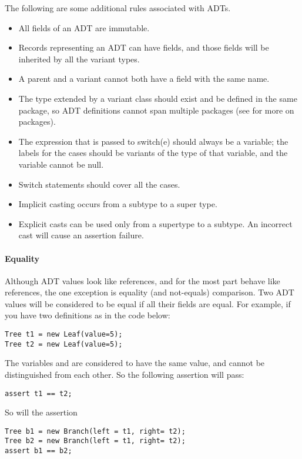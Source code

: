 The following are some additional rules associated with ADTs.
\begin{itemize}
\item All fields of an ADT are immutable.
\item Records representing an ADT can have fields, and those fields will be inherited by all the variant types.
\item A parent and a variant cannot both have a field with the same name.
\item The type extended by a variant class should exist and be defined in the same package, so ADT definitions cannot span multiple packages (see  for more on packages).
\item The expression that is passed to switch(e) should always be a variable; the labels for the cases should be variants of the type of that variable, and the variable cannot be null.
\item Switch statements should cover all the cases.
\item Implicit casting occurs from a subtype to a super type.
\item Explicit casts can be used only from a supertype to a subtype. An incorrect cast will cause an assertion failure.
\end{itemize}


\paragraph{Equality}

Although ADT values look like references, and for the most part behave like references, the one exception is equality (and not-equals) comparison. Two ADT values will be considered to be equal if all their fields are equal. For example, if you have two definitions as in the code below:

\begin{lstlisting}
Tree t1 = new Leaf(value=5);
Tree t2 = new Leaf(value=5);
\end{lstlisting}

The variables  and  are considered to have the same value, and cannot be distinguished from each other. So the following assertion will pass:
\begin{lstlisting}
assert t1 == t2;
\end{lstlisting}
So will the assertion

\begin{lstlisting}
Tree b1 = new Branch(left = t1, right= t2);
Tree b2 = new Branch(left = t1, right= t2);
assert b1 == b2;
\end{lstlisting}

